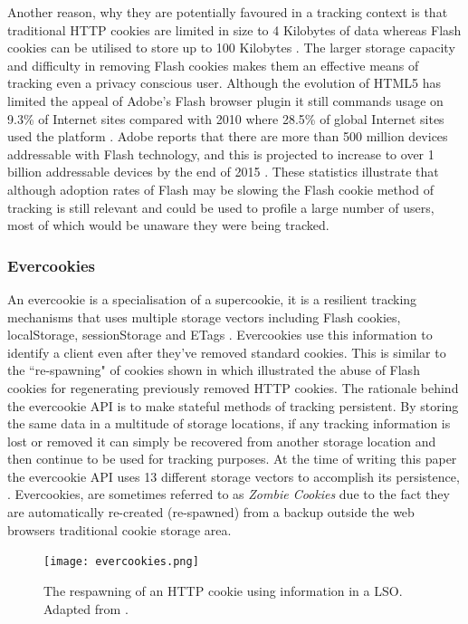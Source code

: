 \documentclass[12pt]{article}
\begin{document}
Another reason, why they are potentially favoured in a tracking context is that traditional HTTP cookies are limited in size to 4 Kilobytes of data whereas Flash cookies can be utilised to store up to 100 Kilobytes \parencite{flashCookies}. The larger storage capacity and difficulty in removing Flash cookies makes them an effective means of tracking even a privacy conscious user. Although the evolution of HTML5 has limited the appeal of Adobe's Flash browser plugin it still commands usage on 9.3\% of Internet sites compared with 2010 where 28.5\% of global Internet sites used the platform \parencite{flashStats}. Adobe reports that there are more than 500 million devices addressable with Flash technology, and this is projected to increase to over 1 billion addressable devices by the end of 2015 \parencite{adobeFlash}. These statistics illustrate that although adoption rates of Flash may be slowing the Flash cookie method of tracking is still relevant and could be used to profile a large number of users, most of which would be unaware they were being tracked. 

\subsubsection{Evercookies} \label{evercookies}
An evercookie is a specialisation of a supercookie, it is a resilient tracking mechanisms that uses multiple storage vectors including Flash cookies, localStorage, sessionStorage and ETags \parencite{evercookies}. Evercookies use this information to identify a client even after they've removed standard cookies. This is similar to the ``re-spawning" of cookies shown in \parencite{flashCookiesPrivacy} which illustrated the abuse of Flash cookies for regenerating previously removed HTTP cookies. The rationale behind the evercookie API is to make stateful methods of tracking persistent. By storing the same data in a multitude of storage locations, if any tracking information is lost or removed it can simply be recovered from another storage location and then continue to be used for tracking purposes. At the time of writing this paper the evercookie API uses 13 different storage vectors to accomplish its persistence,  \parencite{evercookies}. Evercookies, are sometimes referred to as \textit{Zombie Cookies} due to the fact they are automatically re-created (re-spawned) from a backup outside the web browsers traditional cookie storage area. \\

\begin{figure}[H]
    \centering
    \texttt{[image: evercookies.png]}
    \caption{The respawning of an HTTP cookie using information in a LSO. Adapted from \parencite{webNeverForgets}.}
    \label{fig:evercookies}
\end{figure}
\end{document}
